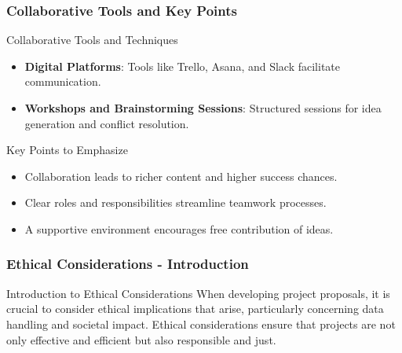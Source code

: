 \documentclass[aspectratio=169]{beamer}
\begin{document}
\begin{frame}[fragile]
    \frametitle{Collaborative Tools and Key Points}
    \begin{block}{Collaborative Tools and Techniques}
        \begin{itemize}
            \item \textbf{Digital Platforms}: Tools like Trello, Asana, and Slack facilitate communication.
            \item \textbf{Workshops and Brainstorming Sessions}: Structured sessions for idea generation and conflict resolution.
        \end{itemize}
    \end{block}

    \begin{block}{Key Points to Emphasize}
        \begin{itemize}
            \item Collaboration leads to richer content and higher success chances.
            \item Clear roles and responsibilities streamline teamwork processes.
            \item A supportive environment encourages free contribution of ideas.
        \end{itemize}
    \end{block}
\end{frame}

\begin{frame}[fragile]
    \frametitle{Ethical Considerations - Introduction}
    \begin{block}{Introduction to Ethical Considerations}
        When developing project proposals, it is crucial to consider ethical implications that arise, particularly concerning data handling and societal impact. Ethical considerations ensure that projects are not only effective and efficient but also responsible and just.
    \end{block}
\end{frame}
\end{document}
